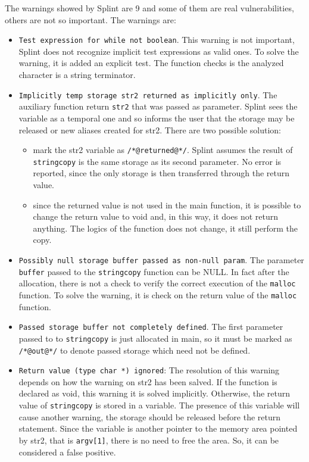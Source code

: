 \documentclass[a4paper]{article}
\begin{document}
The warnings showed by Splint are 9 and some of them are real vulnerabilities, others are 
not so important. The warnings are:
\begin{itemize}
    \item \texttt{Test expression for while not boolean}. This warning is not important,
        Splint does not recognize implicit test expressions as valid ones.
        To solve the warning, it is added an explicit test. The function checks is the analyzed
        character is a string terminator.
    \item \texttt{Implicitly temp storage str2 returned as implicitly only}. The auxiliary function 
        return \texttt{str2} that was passed as parameter. Splint sees the variable as a temporal one 
        and so informs the user that the storage may be released or new aliases created for str2.
        There are two possible solution: 
        \begin{itemize}
            \item mark the str2 variable as \texttt{/*@returned@*/}.
            Splint assumes the result of \texttt{stringcopy} is the same storage as its second
            parameter. No error is reported, since the only
            storage is then transferred through the return value.
            \item since the returned value is not used in the main function, it is possible
            to change the return value to void and, in this way, it does not return anything. The logics of the 
            function does not change, it still perform the copy.
        \end{itemize}
    \item \texttt{Possibly null storage buffer passed as non-null param}. The parameter \texttt{buffer}
        passed to the \texttt{stringcopy} function can be NULL. In fact after the allocation, there is not
        a check to verify the correct execution of the \texttt{malloc} function.
        To solve the warning, it is check on the return value of the \texttt{malloc} function.
    \item \texttt{Passed storage buffer not completely defined}. The first parameter passed to 
        to \texttt{stringcopy} is just allocated in main, so it must be marked as \texttt{/*@out@*/}
        to denote passed storage which need not be defined.

    \item \texttt{Return value (type char *) ignored}: The resolution of this warning depends on how 
        the warning on str2 has been salved. If the function is declared as void, this warning 
        it is solved implicitly. Otherwise, the return value of \texttt{stringcopy} is stored in a variable.
        The presence of this variable will cause another warning, the storage should be released 
        before the return statement. Since the variable is another pointer to the memory area pointed by
        str2, that is \texttt{argv[1]}, there is no need to free the area. So, it can be considered 
        a false positive.


\end{itemize}
\end{document}
